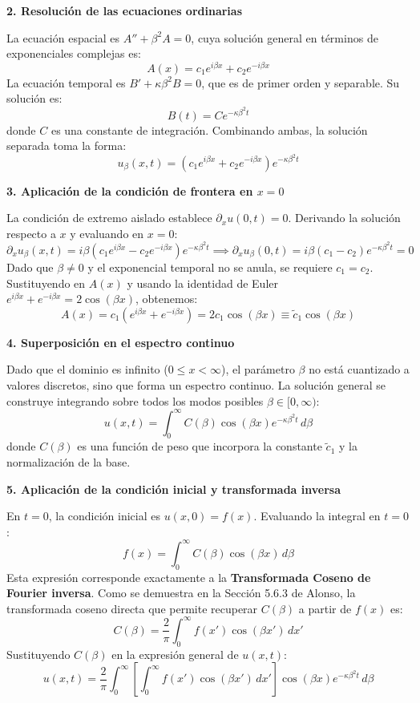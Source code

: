 \documentclass[a4paper]{article}
\begin{document}
\textbf{2. Resolución de las ecuaciones ordinarias}

La ecuación espacial es $A'' + \beta^2 A = 0$, cuya solución general en términos de exponenciales complejas es:
$$ A(x) = c_1 e^{i\beta x} + c_2 e^{-i\beta x} $$
La ecuación temporal es $B' + \kappa \beta^2 B = 0$, que es de primer orden y separable. Su solución es:
$$ B(t) = C e^{-\kappa \beta^2 t} $$
donde $C$ es una constante de integración. Combinando ambas, la solución separada toma la forma:
$$ u_\beta(x, t) = \left( c_1 e^{i\beta x} + c_2 e^{-i\beta x} \right) e^{-\kappa \beta^2 t} $$

\textbf{3. Aplicación de la condición de frontera en $x=0$}

La condición de extremo aislado establece $\partial_x u(0, t) = 0$. Derivando la solución respecto a $x$ y evaluando en $x=0$:
$$ \partial_x u_\beta(x, t) = i\beta \left( c_1 e^{i\beta x} - c_2 e^{-i\beta x} \right) e^{-\kappa \beta^2 t} \implies \partial_x u_\beta(0, t) = i\beta (c_1 - c_2) e^{-\kappa \beta^2 t} = 0 $$
Dado que $\beta \neq 0$ y el exponencial temporal no se anula, se requiere $c_1 = c_2$. Sustituyendo en $A(x)$ y usando la identidad de Euler $e^{i\beta x} + e^{-i\beta x} = 2\cos(\beta x)$, obtenemos:
$$ A(x) = c_1 (e^{i\beta x} + e^{-i\beta x}) = 2c_1 \cos(\beta x) \equiv \tilde{c}_1 \cos(\beta x) $$


\textbf{4. Superposición en el espectro continuo}

Dado que el dominio es infinito ($0 \leq x < \infty$), el parámetro $\beta$ no está cuantizado a valores discretos, sino que forma un espectro continuo. La solución general se construye integrando sobre todos los modos posibles $\beta \in [0, \infty)$:
$$ u(x, t) = \int_0^\infty C(\beta) \cos(\beta x) e^{-\kappa \beta^2 t} \, d\beta $$
donde $C(\beta)$ es una función de peso que incorpora la constante $\tilde{c}_1$ y la normalización de la base.

\textbf{5. Aplicación de la condición inicial y transformada inversa}

En $t=0$, la condición inicial es $u(x, 0) = f(x)$. Evaluando la integral en $t=0$:
$$ f(x) = \int_0^\infty C(\beta) \cos(\beta x) \, d\beta $$
Esta expresión corresponde exactamente a la \textbf{Transformada Coseno de Fourier inversa}. Como se demuestra en la Sección 5.6.3 de Alonso, la transformada coseno directa que permite recuperar $C(\beta)$ a partir de $f(x)$ es:
$$ C(\beta) = \frac{2}{\pi} \int_0^\infty f(x') \cos(\beta x') \, dx' $$
Sustituyendo $C(\beta)$ en la expresión general de $u(x, t)$:
$$ u(x, t) = \frac{2}{\pi} \int_0^\infty \left[ \int_0^\infty f(x') \cos(\beta x') \, dx' \right] \cos(\beta x) e^{-\kappa \beta^2 t} \, d\beta $$
\end{document}

